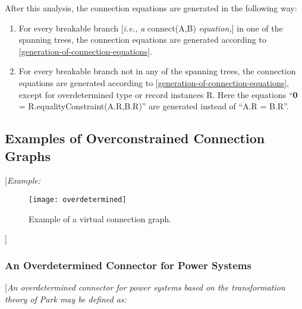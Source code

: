 After this analysis, the connection equations are generated in the
following way:

\begin{enumerate}
\item
  For every breakable branch {[}\emph{i.e., a} connect(A,B)
  \emph{equation,}{]} in one of the spanning trees, the connection
  equations are generated according to \ref{generation-of-connection-equations}.
\item
  For every breakable branch not in any of the spanning trees, the
  connection equations are generated according to \ref{generation-of-connection-equations}, except
  for overdetermined type or record instances R. Here the equations
  ``\textbf{0} = R.equalityConstraint(A.R,B.R)'' are generated instead
  of ``A.R = B.R''.
\end{enumerate}

\subsection{Examples of Overconstrained Connection Graphs}

{[}\emph{Example:}

\begin{figure}[H]
\caption{Example of a virtual connection graph.}
\texttt{[image: overdetermined]}
\end{figure}

{]}

\subsubsection{An Overdetermined Connector for Power Systems}

{[}\emph{An overdetermined connector for power systems based on the
transformation theory of Park may be defined as:}

